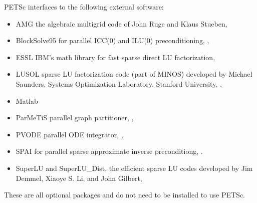 \vspace{.3in}
\noindent
PETSc interfaces to the following external software:
\begin{itemize}
  \item AMG          the algebraic multigrid code of John Ruge and Klaus Stueben,
  \item BlockSolve95 for parallel ICC(0) and ILU(0) preconditioning,
                     ,
  \item ESSL         IBM's math library for fast sparse direct LU factorization,
  \item LUSOL        sparse LU factorization code (part of MINOS) developed by Michael Saunders,
                      Systems Optimization Laboratory, Stanford University,
                     ,
  \item Matlab       
  \item ParMeTiS      parallel graph partitioner, ,
  \item PVODE        parallel ODE integrator, ,
  \item SPAI         for parallel sparse approximate inverse preconditiong, 
                     .
  \item SuperLU and SuperLU\_Dist, the efficient sparse LU codes developed by Jim Demmel,  Xiaoye S. Li, and John Gilbert,  
\end{itemize}
These are all optional packages and do not need to be installed to use PETSc.


